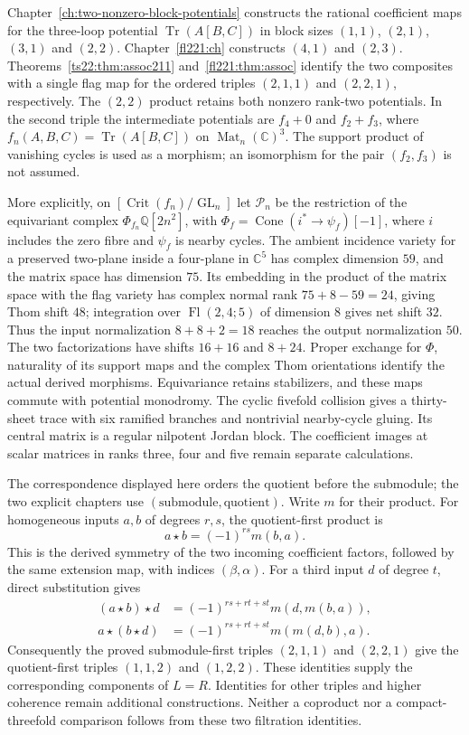 Chapter~\ref{ch:two-nonzero-block-potentials} constructs the rational
coefficient maps for the three-loop potential $\operatorname{Tr}(A[B,C])$
in block sizes $(1,1)$, $(2,1)$, $(3,1)$ and $(2,2)$.
Chapter~\ref{fl221:ch} constructs $(4,1)$ and $(2,3)$.
Theorems~\ref{ts22:thm:assoc211} and~\ref{fl221:thm:assoc} identify the
two composites with a single flag map for the ordered triples $(2,1,1)$
and $(2,2,1)$, respectively. The $(2,2)$ product retains both nonzero
rank-two potentials. In the second triple the intermediate potentials
are $f_4+0$ and $f_2+f_3$, where
$f_n(A,B,C)=\operatorname{Tr}(A[B,C])$ on $\operatorname{Mat}_n(\mathbb C)^3$.
The support product of vanishing cycles is used as a morphism; an
isomorphism for the pair $(f_2,f_3)$ is not assumed.

More explicitly, on $[\operatorname{Crit}(f_n)/\operatorname{GL}_n]$ let
$\mathcal P_n$ be the restriction of the equivariant complex
$\Phi_{f_n}\mathbb Q[2n^2]$, with
$\Phi_f=\operatorname{Cone}(i^*\to\psi_f)[-1]$, where $i$ includes the zero
fibre and $\psi_f$ is nearby cycles. The ambient incidence variety for a
preserved two-plane inside a four-plane in $\mathbb C^5$ has complex
dimension $59$, and the matrix space has dimension $75$.
Its embedding in the product of the matrix space with the flag variety
has complex normal rank $75+8-59=24$, giving Thom shift $48$; integration over
$\operatorname{Fl}(2,4;5)$ of dimension $8$ gives net shift $32$.
Thus the input normalization $8+8+2=18$ reaches the output normalization
$50$. The two factorizations have shifts $16+16$ and $8+24$.
Proper exchange for $\Phi$, naturality of its support maps and the complex
Thom orientations identify the actual derived morphisms. Equivariance
retains stabilizers, and these maps commute with potential monodromy.
The cyclic fivefold collision gives a thirty-sheet trace with six
ramified branches and nontrivial nearby-cycle gluing. Its central matrix
is a regular nilpotent Jordan block. The coefficient images at scalar
matrices in ranks three, four and five remain separate calculations.

The correspondence displayed here orders the quotient before the
submodule; the two explicit chapters use $(\text{submodule},\text{quotient})$.
Write $m$ for their product. For homogeneous inputs $a,b$ of degrees $r,s$,
the quotient-first product is
\[
 a\star b=(-1)^{rs}m(b,a).
\]
This is the derived symmetry of the two incoming coefficient factors,
followed by the same extension map, with indices $(\beta,\alpha)$.
For a third input $d$ of degree $t$, direct substitution gives
\[
 \begin{aligned}
 (a\star b)\star d
 &=(-1)^{rs+rt+st}m(d,m(b,a)),\\
 a\star(b\star d)
 &=(-1)^{rs+rt+st}m(m(d,b),a).
 \end{aligned}
\]
Consequently the proved submodule-first triples $(2,1,1)$ and $(2,2,1)$
give the quotient-first triples $(1,1,2)$ and $(1,2,2)$.
These identities supply the corresponding components of $L=R$.
Identities for other triples and higher coherence remain additional
constructions. Neither a coproduct nor a compact-threefold comparison
follows from these two filtration identities.

